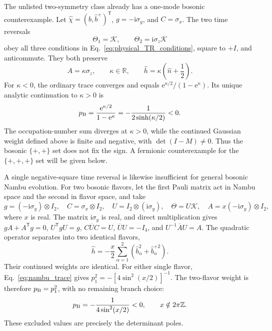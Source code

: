\documentclass[onecolumn,aps,prb,amsmath,amssymb,superscriptaddress,longbibliography]{revtex4-2}
\newcommand{\ee}{\mathrm{e}}
\newcommand{\ii}{\mathrm{i}}
\newcommand{\trans}{\mathsf{T}}
\newcommand{\mc}[1]{\mathcal{#1}}
\begin{document}
The unlisted two-symmetry class already has a one-mode bosonic counterexample.  Let \(\hat\chi=(\hat b,\hat b^+)^\trans\), \(g=-\ii\sigma_y\), and \(C=\sigma_x\).  The two time reversals
\begin{equation}
    \Theta_1=\mc K,
    \qquad
    \Theta_2=\ii\sigma_z\mc K
    \label{eq:boson_pp_counter_TR}
\end{equation}
obey all three conditions in Eq.~\eqref{eq:physical_TR_conditions}, square to \(+I\), and anticommute.  They both preserve
\begin{equation}
    A=\kappa\sigma_z,
    \qquad \kappa\in\mathbb R,
    \qquad
    \hat h=\kappa\left(\hat n+\frac12\right).
    \label{eq:boson_pp_counter_h}
\end{equation}
For \(\kappa<0\), the ordinary trace converges and equals \(\ee^{\kappa/2}/(1-\ee^\kappa)\).  Its unique analytic continuation to \(\kappa>0\) is
\begin{equation}
    p_{\rm B}=\frac{\ee^{\kappa/2}}{1-\ee^\kappa}
    =-\frac{1}{2\sinh(\kappa/2)}<0.
    \label{eq:boson_pp_counter_weight}
\end{equation}
The occupation-number sum diverges at \(\kappa>0\), while the continued Gaussian weight defined above is finite and negative, with \(\det(I-M)\ne0\).  Thus the bosonic \(\{+,+\}\) set does not fix the sign.  A fermionic counterexample for the \(\{+,+,+\}\) set will be given below.

A single negative-square time reversal is likewise insufficient for general bosonic Nambu evolution.  For two bosonic flavors, let the first Pauli matrix act in Nambu space and the second in flavor space, and take
\begin{equation}
    g=(-\ii\sigma_y)\otimes I_2,
    \quad C=\sigma_x\otimes I_2,
    \quad U=I_2\otimes(\ii\sigma_y),
    \quad \Theta=U\mc K,
    \quad A=x(-\ii\sigma_y)\otimes I_2,
    \label{eq:boson_single_minus_counterexample}
\end{equation}
where \(x\) is real.  The matrix \(\ii\sigma_y\) is real, and direct multiplication gives \(gA+A^\trans g=0\), \(U^\trans gU=g\), \(C\overline UC=U\), \(\overline U U=-I_4\), and \(U^{-1}\overline AU=A\).  The quadratic operator separates into two identical flavors,
\begin{equation}
    \hat h=-\frac{x}{2}\sum_{\alpha=1}^2
      (\hat b_\alpha^2+\hat b_\alpha^{+2}).
\end{equation}
Their continued weights are identical.  For either single flavor, Eq.~\eqref{eq:nambu_trace} gives \(p_1^2=-[4\sin^2(x/2)]^{-1}\).  The two-flavor weight is therefore \(p_{\rm B}=p_1^2\), with no remaining branch choice:
\begin{equation}
    p_{\rm B}=-\frac{1}{4\sin^2(x/2)}<0,
    \qquad x\notin2\pi\mathbb Z.
    \label{eq:boson_single_minus_weight}
\end{equation}
These excluded values are precisely the determinant poles.
\end{document}
